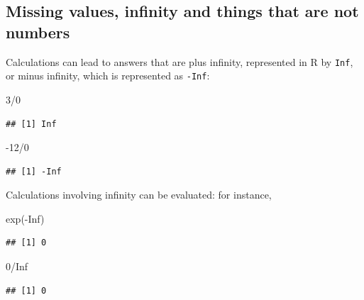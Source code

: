 \documentclass[
]{book}
\newenvironment{Shaded}{\begin{snugshade}}{\end{snugshade}}
\newcommand{\ConstantTok}[1]{\textcolor[rgb]{0.00,0.00,0.00}{#1}}
\newcommand{\DecValTok}[1]{\textcolor[rgb]{0.00,0.00,0.81}{#1}}
\newcommand{\FunctionTok}[1]{\textcolor[rgb]{0.00,0.00,0.00}{#1}}
\newcommand{\NormalTok}[1]{#1}
\newcommand{\SpecialCharTok}[1]{\textcolor[rgb]{0.00,0.00,0.00}{#1}}
\begin{document}
\hypertarget{missing-values-infinity-and-things-that-are-not-numbers}{%
\subsection{Missing values, infinity and things that are not numbers}\label{missing-values-infinity-and-things-that-are-not-numbers}}

Calculations can lead to answers that are plus infinity, represented in R by \texttt{Inf}, or minus infinity, which is represented as \texttt{-Inf}:

\begin{Shaded}
\begin{Highlighting}[]
\DecValTok{3}\SpecialCharTok{/}\DecValTok{0}
\end{Highlighting}
\end{Shaded}

\begin{verbatim}
## [1] Inf
\end{verbatim}

\begin{Shaded}
\begin{Highlighting}[]
\SpecialCharTok{{-}}\DecValTok{12}\SpecialCharTok{/}\DecValTok{0}
\end{Highlighting}
\end{Shaded}

\begin{verbatim}
## [1] -Inf
\end{verbatim}

Calculations involving infinity can be evaluated: for instance,

\begin{Shaded}
\begin{Highlighting}[]
\FunctionTok{exp}\NormalTok{(}\SpecialCharTok{{-}}\ConstantTok{Inf}\NormalTok{)}
\end{Highlighting}
\end{Shaded}

\begin{verbatim}
## [1] 0
\end{verbatim}

\begin{Shaded}
\begin{Highlighting}[]
\DecValTok{0}\SpecialCharTok{/}\ConstantTok{Inf}
\end{Highlighting}
\end{Shaded}

\begin{verbatim}
## [1] 0
\end{verbatim}
\end{document}
